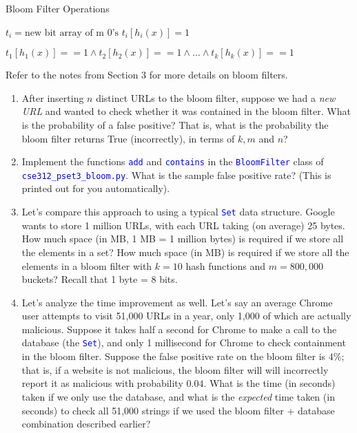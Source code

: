 \documentclass[12pt]{article}
\def\code#1{\textcolor{blue}{\texttt{#1}}}
\renewcommand{\|}{\mid}
\begin{document}
\begin{enumerate}
\begin{algorithm}
\caption{Bloom Filter Operations}
\begin{algorithmic}[1]

\State $t_i=\text{new bit array of m 0's}$
\EndFor
\EndFunction
{}
\State $t_i[h_i(x)]=1$
\EndFor

\EndFunction
{}

\Return $t_1[h_1(x)] == 1\wedge t_2[h_2(x)]==1 \wedge\dots\wedge t_k[h_k(x)]==1$
\EndFunction
\end{algorithmic}
\end{algorithm}

Refer to the notes from Section 3 for more details on bloom filters.
\begin{enumerate}
    \item After inserting $n$ distinct URLs to the bloom filter, suppose we had a \textit{new URL} and wanted to check whether it was contained in the bloom filter. What is the probability of a false positive? That is, what is the probability the bloom filter returns True (incorrectly), in terms of $k,m$ and $n$? 
    \item Implement the functions \code{add} and \code{contains} in the \code{BloomFilter} class of \\ \code{cse312\_pset3\_bloom.py}. What is the sample false positive rate? (This is printed out for you automatically).
    \item Let's compare this approach to using a typical \code{Set} data structure. Google wants to store 1 million URLs, with each URL taking (on average) 25 bytes. How much space (in MB, 1 MB = 1 million bytes) is required if we store all the elements in a set? How much space (in MB) is required if we store all the elements in a bloom filter with $k=10$ hash functions and $m=800,000$ buckets? Recall that 1 byte = 8 bits. 
    \item Let's analyze the time improvement as well. Let's say an average Chrome user attempts to visit 51,000 URLs in a year, only 1,000 of which are actually malicious. Suppose it takes half a second for Chrome to make a call to the database (the \code{Set}), and only 1 millisecond for Chrome to check containment in the bloom filter. Suppose the false positive rate on the bloom filter is $4\%$; that is, if a website is not malicious, the bloom filter will will incorrectly report it as malicious with probability $0.04$. What is the time (in seconds) taken if we only use the database, and what is the \textit{expected} time taken (in seconds) to check all 51,000 strings if we used the bloom filter + database combination described earlier?    
\end{enumerate}


\end{enumerate}
\end{document}

